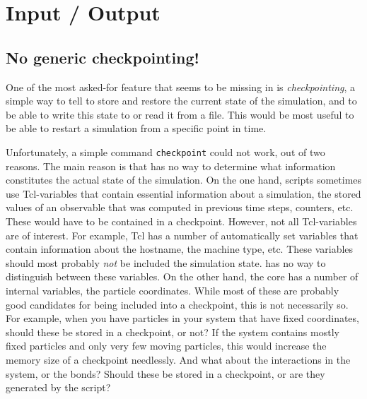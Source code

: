 %  
%   
%  
%  
%
\chapter{Input / Output}
\label{cha:io}

\section{No generic checkpointing!}
\label{sec:checkpointing}

One of the most asked-for feature that seems to be missing in \es is
\emph{checkpointing}, \ie a simple way to tell \es to store and
restore the current state of the simulation, and to be able to write
this state to or read it from a file. This would be most useful to be
able to restart a simulation from a specific point in time.

Unfortunately, a simple command \texttt{checkpoint} could not work,
out of two reasons.  The main reason is that \es has no way to
determine what information constitutes the actual state of the
simulation.  On the one hand, \es scripts sometimes use Tcl-variables
that contain essential information about a simulation, \eg the stored
values of an observable that was computed in previous time steps,
counters, etc.  These would have to be contained in a checkpoint.
However, not all Tcl-variables are of interest. For example, Tcl has a
number of automatically set variables that contain information about
the hostname, the machine type, etc. These variables should most
probably \emph{not} be included the simulation state. \es has no way
to distinguish between these variables.  On the other hand, the \es
core has a number of internal variables, \eg the particle coordinates.
While most of these are probably good candidates for being included
into a checkpoint, this is not necessarily so.  For example, when you
have particles in your system that have fixed coordinates, should
these be stored in a checkpoint, or not?  If the system contains
mostly fixed particles and only very few moving particles, this would
increase the memory size of a checkpoint needlessly. And what about
the interactions in the system, or the bonds? Should these be stored
in a checkpoint, or are they generated by the script?

